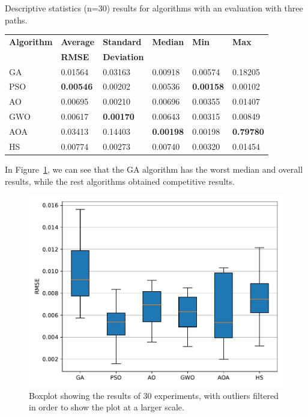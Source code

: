 \documentclass[symmetry,article,submit,moreauthors,pdftex]{Definitions/mdpi}
\begin{document}
\begin{specialtable}[H] 
\small
\caption{Descriptive statistics (n=30) results for algorithms with an evaluation
    with three paths.}\label{tab:statistics}
\begin{tabular}{llllll}
\toprule
\textbf{Algorithm} & \textbf{Average }	& \textbf{Standard } &\textbf{Median} & \textbf{Min} & \textbf{Max}\\
                   & \textbf{RMSE}	    & \textbf{ Deviation}&                &              &            \\
\midrule
GA                  &  0.01564           & 0.03163              & 0.00918     &   0.00574    &  0.18205   \\
PSO                 &  \textbf{0.00546}  & 0.00202              & 0.00536     &   \textbf{0.00158}    &  0.00102   \\
AO                  &  0.00695           & 0.00210              & 0.00696     &   0.00355    &  0.01407   \\
GWO                 &  0.00617           & \textbf{0.00170}     & 0.00643     &   0.00315    &  0.00849   \\
AOA                 &  0.03413           & 0.14403              & \textbf{0.00198} & 0.00198 &  \textbf{0.79780}   \\
HS                  &  0.00774           & 0.00273              & 0.00740     &   0.00320    &  0.01454   \\
\bottomrule
\end{tabular}
\end{specialtable}

In Figure~\ref{fig:boxplot}, we can see that the GA algorithm has the worst median and overall results,
while the rest algorithms obtained competitive results.

\begin{figure}[H]
\centering
\includegraphics[width=9 cm]{img/boxplot}
\caption{
Boxplot showing the results of 30 experiments, with outliers filtered in order to 
show the plot at a larger scale.
}\label{fig:boxplot}
\end{figure}
\end{document}
